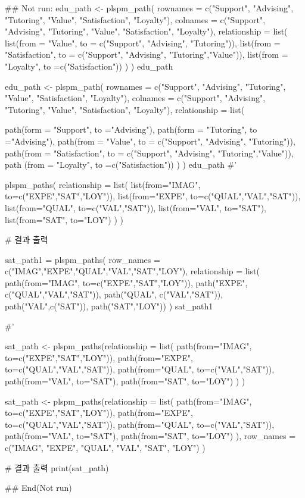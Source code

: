 \documentclass[a4paper]{book}
\begin{document}
\begin{Examples}
\begin{ExampleCode}

\#\# Not run: 
edu_path <- plspm_path(
  rownames = c("Support", "Advising", "Tutoring", "Value", "Satisfaction", "Loyalty"),
  colnames = c("Support", "Advising", "Tutoring", "Value", "Satisfaction", "Loyalty"),
  relationship = list(
    list(from = "Value",
         to = c("Support", "Advising", "Tutoring")),
    list(from = "Satisfaction",
         to = c("Support", "Advising", "Tutoring","Value")),
    list(from = "Loyalty",
         to =c("Satisfaction"))
  )
)
edu_path


edu_path <- plspm_path(
  rownames = c("Support", "Advising", "Tutoring", "Value", "Satisfaction", "Loyalty"),
  colnames = c("Support", "Advising", "Tutoring", "Value", "Satisfaction", "Loyalty"),
  relationship = list(

    path(form = "Support", to ="Advising"),
    path(form = "Tutoring", to ="Advising"),
    path(from = "Value",
         to = c("Support", "Advising", "Tutoring")),
    path(from = "Satisfaction",
         to = c("Support", "Advising", "Tutoring","Value")),
    path (from = "Loyalty",
         to =c("Satisfaction"))
  )
)
edu_path
#'

plspm_paths(
  relationship = list(
    list(from="IMAG", to=c("EXPE","SAT","LOY")),
    list(from="EXPE", to=c("QUAL","VAL","SAT")),
    list(from="QUAL", to=c("VAL","SAT")),
    list(from="VAL", to="SAT"),
    list(from="SAT", to="LOY")
  )
)

# 결과 출력

sat_path1 = plspm_paths(
  row_names = c("IMAG","EXPE","QUAL","VAL","SAT","LOY"),
  relationship = list(
    path(from="IMAG", to=c("EXPE","SAT","LOY")),
    path("EXPE", c("QUAL","VAL","SAT")),
    path("QUAL", c("VAL","SAT")),
    path("VAL",c("SAT")),
    path("SAT","LOY"))
)
sat_path1

#'

sat_path <- plspm_paths(relationship = list(
  path(from="IMAG", to=c("EXPE","SAT","LOY")),
  path(from="EXPE", to=c("QUAL","VAL","SAT")),
  path(from="QUAL", to=c("VAL","SAT")),
  path(from="VAL", to="SAT"),
  path(from="SAT", to="LOY")
) )

sat_path <- plspm_paths(relationship = list(
  path(from="IMAG", to=c("EXPE","SAT","LOY")),
  path(from="EXPE", to=c("QUAL","VAL","SAT")),
  path(from="QUAL", to=c("VAL","SAT")),
  path(from="VAL", to="SAT"),
  path(from="SAT", to="LOY")
),
row_names =  c("IMAG", "EXPE", "QUAL", "VAL", "SAT", "LOY")
)

# 결과 출력
print(sat_path)



## End(Not run)
\end{ExampleCode}
\end{Examples}
\end{document}
